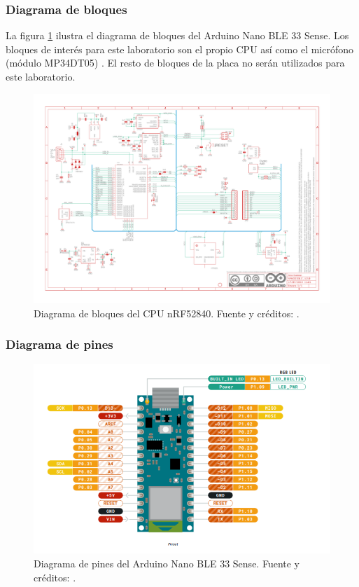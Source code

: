 \subsubsection{Diagrama de bloques}
La figura \ref{mcu-diagram} ilustra el diagrama de bloques del Arduino Nano BLE 33 Sense. Los bloques de interés para este laboratorio son el propio CPU así como el micrófono (módulo MP34DT05) \cite{nano33}. El resto de bloques de la placa no serán utilizados para este laboratorio.

\begin{figure}[H]
    \centering
    \includegraphics[width=\textwidth]{Documentos/NANO33BLE_V2.0_sch.pdf}
    \caption{Diagrama de bloques del CPU nRF52840. Fuente y créditos: \cite{nano33}.}
    \label{mcu-diagram}
\end{figure}


\subsubsection{Diagrama de pines}

\begin{figure}[H]
    \centering
    \includegraphics[width=\textwidth]{Imagenes/Arduino_Nano.png}
    \caption{Diagrama de pines del Arduino Nano BLE 33 Sense. Fuente y créditos: \cite{nano33}.}
    \label{pinout}
\end{figure}